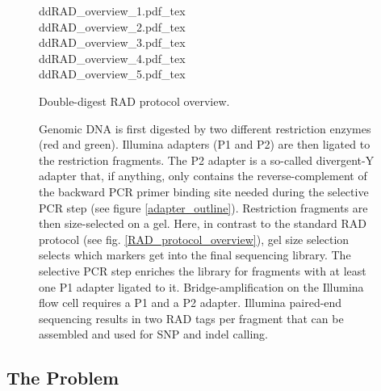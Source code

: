 \documentclass[a4paper,12pt,times,print,index,custombib,custommargin]{PhDThesisPSnPDF}\usepackage[]{graphicx}\usepackage[]{color}
\begin{document}
\begin{figure}
\def\svgwidth{.9\textwidth}
{ddRAD_overview_1.pdf_tex}\\ 
\def\svgwidth{\textwidth}
{ddRAD_overview_2.pdf_tex}\\
\def\svgwidth{.9\textwidth}
{ddRAD_overview_3.pdf_tex}\\
\def\svgwidth{.9\textwidth}
{ddRAD_overview_4.pdf_tex}\\
\def\svgwidth{.9\textwidth}
{ddRAD_overview_5.pdf_tex}
\caption[Double-digest RAD protocol overview.]{Double-digest RAD protocol overview.}
\label{ddRAD_protocol_overview}
\end{figure}

\begin{figure}[t]
\ContinuedFloat
\caption[]{Genomic DNA is first digested by two different restriction enzymes (red and green). Illumina adapters (P1 and P2) are then ligated to the restriction fragments. The P2 adapter is a so-called divergent-Y adapter that, if anything, only contains the reverse-complement of the backward PCR primer binding site needed during the selective PCR step (see figure \ref{adapter_outline}). Restriction fragments are then size-selected on a gel. Here, in contrast to the standard RAD protocol (see fig. \ref{RAD_protocol_overview}), gel size selection selects which markers get into the final sequencing library. The selective PCR step enriches the library for fragments with at least one P1 adapter ligated to it. Bridge-amplification on the Illumina flow cell requires a P1 and a P2 adapter. Illumina paired-end sequencing results in two RAD tags per fragment that can be assembled and used for SNP and indel calling.}
\end{figure}


\subsection{The Problem}
\end{document}
